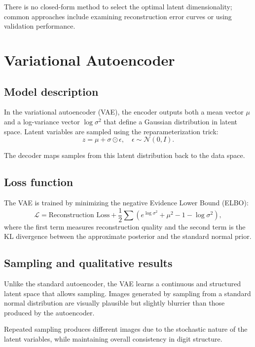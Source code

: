 \documentclass[11pt,a4paper]{article}
\begin{document}
There is no closed-form method to select the optimal latent dimensionality; common approaches include examining reconstruction error curves or using validation performance.

\section{Variational Autoencoder}

\subsection{Model description}
In the variational autoencoder (VAE), the encoder outputs both a mean vector $\mu$ and a log-variance vector $\log\sigma^2$ that define a Gaussian distribution in latent space. Latent variables are sampled using the reparameterization trick:
\[
z = \mu + \sigma \odot \epsilon, \quad \epsilon \sim \mathcal{N}(0, I).
\]

The decoder maps samples from this latent distribution back to the data space.

\subsection{Loss function}
The VAE is trained by minimizing the negative Evidence Lower Bound (ELBO):
\[
\mathcal{L} = \text{Reconstruction Loss} + \frac{1}{2}\sum \left( e^{\log\sigma^2} + \mu^2 - 1 - \log\sigma^2 \right),
\]
where the first term measures reconstruction quality and the second term is the KL divergence between the approximate posterior and the standard normal prior.

\subsection{Sampling and qualitative results}
Unlike the standard autoencoder, the VAE learns a continuous and structured latent space that allows sampling. Images generated by sampling from a standard normal distribution are visually plausible but slightly blurrier than those produced by the autoencoder.

Repeated sampling produces different images due to the stochastic nature of the latent variables, while maintaining overall consistency in digit structure.
\end{document}
